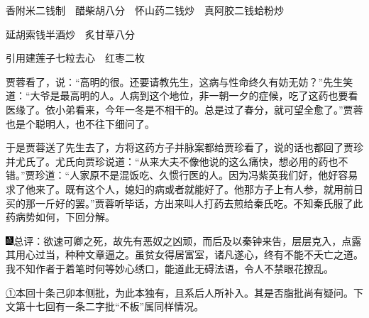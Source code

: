 香附米{二钱制}　醋柴胡{八分}　怀山药{二钱炒}　真阿胶{二钱蛤粉炒}

延胡索{钱半酒炒}　炙甘草{八分}

引用建莲子七粒去心　红枣二枚

贾蓉看了，说：``高明的很。还要请教先生，这病与性命终久有妨无妨？''先生笑道：``大爷是最高明的人。人病到这个地位，非一朝一夕的症候，吃了这药也要看医缘了。依小弟看来，今年一冬是不相干的。总是过了春分，就可望全愈了。''贾蓉也是个聪明人，也不往下细问了。

于是贾蓉送了先生去了，方将这药方子并脉案都给贾珍看了，说的话也都回了贾珍并尤氏了。尤氏向贾珍说道：``从来大夫不像他说的这么痛快，想必用的药也不错。''贾珍道：``人家原不是混饭吃、久惯行医的人。因为冯紫英我们好，他好容易求了他来了。既有这个人，媳妇的病或者就能好了。他那方子上有人参，就用前日买的那一斤好的罢。''贾蓉听毕话，方出来叫人打药去煎给秦氏吃。不知秦氏服了此药病势如何，下回分解。

{\includegraphics[width=3mm]{../Images/00005}总评：欲速可卿之死，故先有恶奴之凶顽，而后及以秦钟来告，层层克入，点露其用心过当，种种文章逼之。虽贫女得居富室，诸凡遂心，终有不能不夭亡之道。我不知作者于着笔时何等妙心绣口，能道此无碍法语，令人不禁眼花撩乱。}

{\href{../Text/part0014_split_000.html\#navto_1_a}{①}本回十条己卯本侧批，为此本独有，且系后人所补入。其是否脂批尚有疑问。下文第十七回有一条二字批``不板''属同样情况。}
